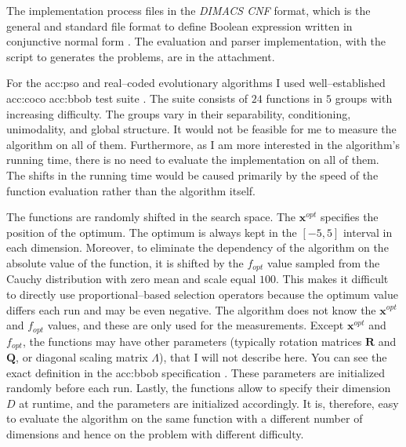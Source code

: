The implementation process files in the \textit{DIMACS CNF} format, which is the general and standard file format to define Boolean expression written in conjunctive normal form \citep{challenge1993satisfiability}. The evaluation and parser implementation, with the script to generates the problems, are in the attachment.

For the \acrlong{acc:pso} and real--coded evolutionary algorithms I used well--established \acrfull{acc:coco} \acrfull{acc:bbob} test suite \citep{hansen2010comparing}. The suite consists of $24$ functions in $5$ groups with increasing difficulty. The groups vary in their separability, conditioning, unimodality, and global structure. It would not be feasible for me to measure the algorithm on all of them. Furthermore, as I am more interested in the algorithm's running time, there is no need to evaluate the implementation on all of them. The shifts in the running time would be caused primarily by the speed of the function evaluation rather than the algorithm itself.

The functions are randomly shifted in the search space. The $\mathbf{x}^{opt}$ specifies the position of the optimum. The optimum is always kept in the $\left[-5,5\right]$ interval in each dimension. Moreover, to eliminate the dependency of the algorithm on the absolute value of the function, it is shifted by the $f_{opt}$ value sampled from the Cauchy distribution with zero mean and scale equal $100$. This makes it difficult to directly use proportional--based selection operators because the optimum value differs each run and may be even negative. The algorithm does not know the $\mathbf{x}^{opt}$ and $f_{opt}$ values, and these are only used for the measurements. Except $\mathbf{x}^{opt}$ and $f_{opt}$, the functions may have other parameters (typically rotation matrices $\mathbf{R}$ and $\mathbf{Q}$, or diagonal scaling matrix $\Lambda$), that I will not describe here. You can see the exact definition in the \acrshort{acc:bbob} specification \citep{hansen2010comparing}. These parameters are initialized randomly before each run. Lastly, the functions allow to specify their dimension $D$ at runtime, and the parameters are initialized accordingly. It is, therefore, easy to evaluate the algorithm on the same function with a different number of dimensions and hence on the problem with different difficulty.

